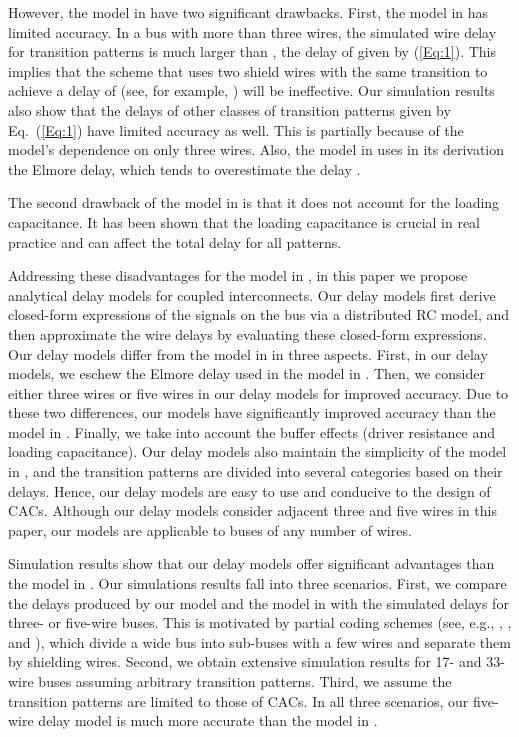 \documentclass[10pt,journal]{IEEEtran}
\begin{document}
However, the model in \cite{Sot01} have two significant drawbacks. First, the model in \cite{Sot01} has limited accuracy. In a bus with more than three wires, the simulated wire delay for  transition patterns is much larger than , the delay of  given by (\ref{Eq:1}). This implies that the scheme that uses two shield wires with the same transition to achieve a delay of  (see, for example, \cite{Dua04}) will be ineffective. Our simulation results also show that the delays of other classes of transition patterns given by Eq.~(\ref{Eq:1}) have limited accuracy as well. This is partially because of the model's dependence on only three wires.
Also, the model in \cite{Sot01} uses in its derivation the Elmore delay, which tends to overestimate the delay \cite{Elm48,Gup97}.

The second drawback of the model in \cite{Sot01} is that it does not account for the loading capacitance. It has been shown that the loading capacitance is crucial in real practice and can affect the total delay for all patterns.




Addressing these disadvantages for the model in \cite{Sot01}, in this paper we propose analytical delay models for coupled interconnects. Our delay models first derive closed-form expressions of the signals on the bus via a distributed RC model, and then approximate the wire delays by evaluating these closed-form expressions.
Our delay models differ from the model in \cite{Sot01} in three aspects. First, in our delay models, we eschew the Elmore delay used in the model in \cite{Sot01}. Then, we consider either three wires or five wires in our delay models for improved accuracy. Due to these two differences, our models have significantly improved accuracy than the model in \cite{Sot01}. Finally, we take into account the buffer effects (driver resistance and loading capacitance). Our delay models also maintain the simplicity of the model in \cite{Sot01}, and the transition patterns are divided into several categories based on their delays. Hence, our delay models are easy to use and conducive to the design of CACs.
Although our delay models consider adjacent three and five wires in this paper, our models are applicable to buses of any number of wires.

Simulation results show that our delay models offer significant advantages than the model in \cite{Sot01}. Our simulations results fall into three scenarios. First, we compare the delays produced by our model and the model in \cite{Sot01} with the simulated delays for three- or five-wire buses. This is motivated by partial coding schemes (see, e.g., \cite{Dua01}, \cite{Vic01}, and \cite{Sri07}), which divide a wide bus into sub-buses with a few wires and separate them by shielding wires.
Second, we obtain extensive simulation results for 17- and 33-wire buses assuming arbitrary transition patterns. Third, we assume the transition patterns are limited to those of CACs. In all three scenarios, our five-wire delay model is much more accurate than the model in \cite{Sot01}. 
\end{document}
